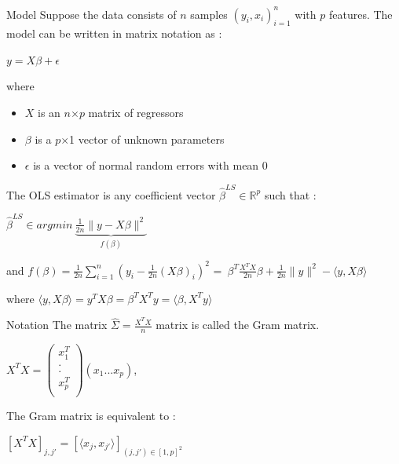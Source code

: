 \documentclass[unknownkeysallowed]{beamer}
\begin{document}
\begin{frame}
\begin{alertblock}{Model}
Suppose the data consists of $n$ samples $( y_i, x_i )^n_{i=1}$ with $p$ features. 
\newline The model can be written in matrix notation as :
\begin{center}
$y=X\beta+\epsilon$
\end{center}
where
 \begin{itemize}
        \item $X$ is an $n$$\times$$p$ matrix of regressors
        \item $\beta$  is a $p$$\times$1 vector of unknown parameters
        \item $\epsilon$ is a vector of normal random errors with mean 0 
    \end{itemize}
\end{alertblock}
\vspace{0.4cm}
\end{frame}
\begin{frame}
The OLS estimator is any coefficient vector
$\hat\beta^{LS}\in\mathbb{R}^p$ such that :
\newline
\begin{center}
$\hat\beta^{LS} \in argmin \ \underbrace{\frac{1}{2n}\|y-X\beta\|^2 }_{f(\beta)}$ 
\end{center}
\vspace{0.5cm}
and $f(\beta)=\frac{1}{2n}\sum\limits_{i=1}^n (y_{i}-\frac{1}{2n}(X\beta)_{i})^2$ =\ $\beta^T\frac{X^TX}{2n}\beta+\frac{1}{2n}\|y\|^2- \langle y,X\beta\rangle$

\vspace{0.5cm}
where 
$\langle y,X\beta\rangle=y^TX\beta=\beta^TX^Ty=\langle \beta,X^Ty\rangle$


\end{frame}
\begin{block}{Notation}
The matrix $\hat\Sigma=\frac{X^TX}{n}$ matrix is called the Gram matrix.
\begin{center}
    $X^TX=\begin{pmatrix}
   x_{1}^T  \\
   . \\
   . \\
   x_{p}^T  \\
\end{pmatrix}(x_{1}. . . x_{p}) $,
\end{center}

\end{block}
The Gram matrix is equivalent to :
\begin{center}
$[X^TX]_{j,j'}=[\langle x_{j},x_{j'}\rangle]_{(j,j')\in[1,p]^2}$    
\end{center}
\end{document}
